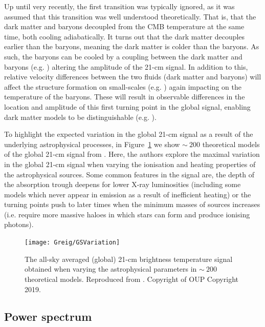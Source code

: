 Up until very recently, the first transition was typically ignored, as it was assumed that this transition was well understood theoretically. That is, that the dark matter and baryons decoupled from the CMB temperature at the same time, both cooling adiabatically. It turns out that the dark matter decouples earlier than the baryons, meaning the dark matter is colder than the baryons. As such, the baryons can be cooled by a coupling between the dark matter and baryons (e.g. \cite{Tashiro:2014}) altering the amplitude of the 21-cm signal. In addition to this, relative velocity differences between the two fluids (dark matter and baryons) will affect the structure formation on small-scales (e.g. \cite{Tseliakhovich:2010}) again impacting on the temperature of the baryons. These will result in observable differences in the location and amplitude of this first turning point in the global signal, enabling dark matter models to be distinguishable (e.g. \cite{Munoz:2015,Fialkov:2018}).

To highlight the expected variation in the global 21-cm signal as a result of the underlying astrophysical processes, in Figure~\ref{fig:global_vary} we show $\sim~200$ theoretical models of the global 21-cm signal from \cite{Cohen:2017}. Here, the authors explore the maximal variation in the global 21-cm signal when varying the ionisation and heating properties of the astrophysical sources. Some common features in the signal are, the depth of the absorption trough deepens for lower X-ray luminosities (including some models which never appear in emission as a result of inefficient heating) or the turning points push to later times when the minimum masses of sources increases (i.e. require more massive haloes in which stars can form and produce ionising photons).

\begin{figure}[]
\begin{center}
\texttt{[image: Greig/GSVariation]}
\end{center}
\caption{The all-sky averaged (global) 21-cm brightness temperature signal obtained when varying the astrophysical parameters in $\sim~200$ theoretical models. Reproduced from \cite{Cohen:2017}. Copyright of OUP Copyright 2019.}
\label{fig:global_vary}
\end{figure}

\subsection{Power spectrum}

